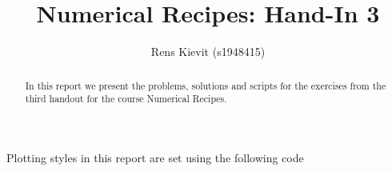 \documentclass[a4paper,10pt]{article}
\title{Numerical Recipes: Hand-In 3}
\author{Rens Kievit (s1948415)}
\begin{document}
\maketitle

\begin{abstract}
    In this report we present the problems, solutions and scripts for the exercises from the third handout for the course Numerical Recipes.
\end{abstract}

Plotting styles in this report are set using the following code




\end{document}

